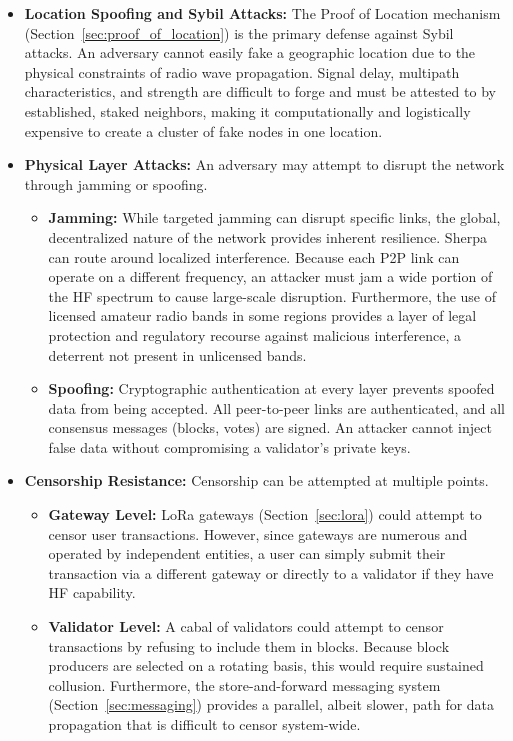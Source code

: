 \documentclass{article}
\begin{document}
\begin{itemize}
    \item \textbf{Location Spoofing and Sybil Attacks:} The Proof of Location mechanism (Section~\ref{sec:proof_of_location}) is the primary defense against Sybil attacks. An adversary cannot easily fake a geographic location due to the physical constraints of radio wave propagation. Signal delay, multipath characteristics, and strength are difficult to forge and must be attested to by established, staked neighbors, making it computationally and logistically expensive to create a cluster of fake nodes in one location.

    \item \textbf{Physical Layer Attacks:} An adversary may attempt to disrupt the network through jamming or spoofing.
        \begin{itemize}
            \item \textbf{Jamming:} While targeted jamming can disrupt specific links, the global, decentralized nature of the network provides inherent resilience. Sherpa can route around localized interference. Because each P2P link can operate on a different frequency, an attacker must jam a wide portion of the HF spectrum to cause large-scale disruption. Furthermore, the use of licensed amateur radio bands in some regions provides a layer of legal protection and regulatory recourse against malicious interference, a deterrent not present in unlicensed bands.
            \item \textbf{Spoofing:} Cryptographic authentication at every layer prevents spoofed data from being accepted. All peer-to-peer links are authenticated, and all consensus messages (blocks, votes) are signed. An attacker cannot inject false data without compromising a validator's private keys.
        \end{itemize}

    \item \textbf{Censorship Resistance:} Censorship can be attempted at multiple points.
        \begin{itemize}
            \item \textbf{Gateway Level:} LoRa gateways (Section~\ref{sec:lora}) could attempt to censor user transactions. However, since gateways are numerous and operated by independent entities, a user can simply submit their transaction via a different gateway or directly to a validator if they have HF capability.
            \item \textbf{Validator Level:} A cabal of validators could attempt to censor transactions by refusing to include them in blocks. Because block producers are selected on a rotating basis, this would require sustained collusion. Furthermore, the store-and-forward messaging system (Section~\ref{sec:messaging}) provides a parallel, albeit slower, path for data propagation that is difficult to censor system-wide.
        \end{itemize}


\end{itemize}
\end{document}
